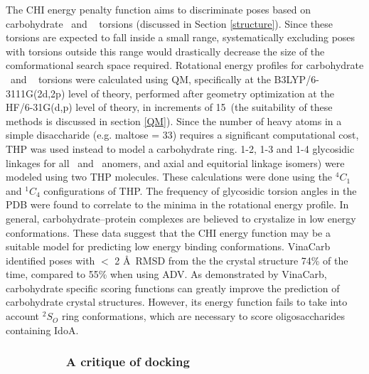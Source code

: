 \documentclass[journal=jctcce,manuscript=article]{achemso}
\begin{document}
{The \ac{CHI} energy penalty function aims to discriminate poses based on carbohydrate \textphi~and \textpsi~ torsions (discussed in Section \ref{structure}). Since these torsions are expected to fall inside a small range,\cite{Woods2018PredictingComplexes, Nivedha2015CarbohydrateChaff} systematically excluding poses with torsions outside this range would drastically decrease the size of the comformational search space required. Rotational energy profiles for carbohydrate \textphi~and \textpsi~ torsions were calculated using \ac{QM}, specifically at the B3LYP/6-3111G(2d,2p) level of theory, performed after geometry optimization at the HF/6-31G(d,p) level of theory, in increments of 15\textdegree~(the suitability of these methods is discussed in section \ref{QM}).\cite{Nivedha2015CarbohydrateChaff, Nivedha2016Vina-Carb:Docking} 
Since the number of heavy atoms in a simple disaccharide (e.g. maltose = 33) requires a significant computational cost, \ac{THP} was used instead to model a carbohydrate ring. 1-2, 1-3 and 1-4 glycosidic linkages for all \textalpha~and \textbeta~anomers, and axial and equitorial linkage isomers) were modeled using two \ac{THP} molecules.\cite{Nivedha2015CarbohydrateChaff, Nivedha2016Vina-Carb:Docking} 
These calculations were done using the $^{4}C_{1}$ and $^{1}C_{4}$ configurations of \ac{THP}. The frequency of glycosidic torsion angles in the \ac{PDB} were found to correlate to the minima in the rotational energy profile. In general, carbohydrate--protein complexes are believed to crystalize in low energy conformations.\cite{Nivedha2015CarbohydrateChaff, Nivedha2016Vina-Carb:Docking}
These data suggest that the \ac{CHI} energy function may be a suitable model for predicting low energy binding conformations. VinaCarb identified poses with $<$ 2 \AA~\ac{RMSD} from the the crystal structure 74\% of the time, compared to 55\% when using \ac{ADV}.\cite{Nivedha2016Vina-Carb:Docking}
As demonstrated by VinaCarb, carbohydrate specific scoring functions can greatly improve the prediction of carbohydrate crystal structures.\cite{Nivedha2015CarbohydrateChaff, Nivedha2016Vina-Carb:Docking} However, its energy function fails to take into account $^{2}S_{O}$ ring conformations, which are necessary to score oligosaccharides containing IdoA. 

\subsubsection*{~~~~~~~~~A critique of docking} \label{critique}


}
\end{document}
